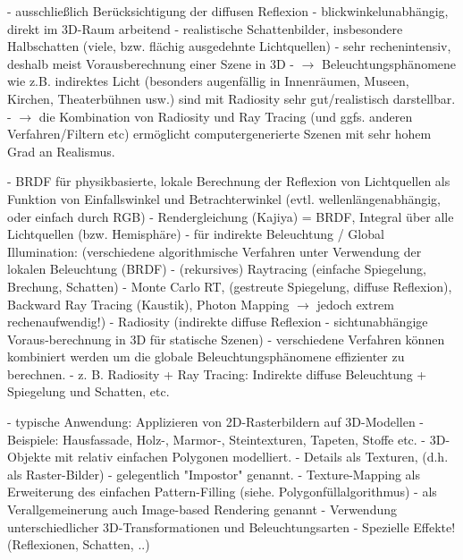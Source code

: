 \documentclass[10pt,landscape]{article}
\makeatletter
\renewcommand{\section}{\@startsection{section}{1}{0mm}%
                                {-1ex plus -.5ex minus -.2ex}%
                                {0.5ex plus .2ex}%
                                {\normalfont\large\bfseries}}
\renewcommand{\subsection}{\@startsection{subsection}{2}{0mm}%
                                {-1explus -.5ex minus -.2ex}%
                                {0.5ex plus .2ex}%
                                {\normalfont\normalsize\bfseries}}
\makeatother
\begin{document}
\begin{multicols}{3}
  
  - ausschließlich Berücksichtigung der diffusen Reflexion
  - blickwinkelunabhängig, direkt im 3D-Raum arbeitend
  - realistische Schattenbilder, insbesondere Halbschatten (viele, bzw. flächig ausgedehnte Lichtquellen)
  - sehr rechenintensiv, deshalb meist Vorausberechnung einer Szene in 3D
  - $\rightarrow$ Beleuchtungsphänomene wie z.B. indirektes Licht (besonders augenfällig in Innenräumen, Museen, Kirchen, Theaterbühnen usw.) sind mit Radiosity sehr gut/realistisch darstellbar.
  - $\rightarrow$ die Kombination von Radiosity und Ray Tracing (und ggfs. anderen Verfahren/Filtern etc) ermöglicht computergenerierte Szenen mit sehr hohem Grad an Realismus.
  
  - BRDF für physikbasierte, lokale Berechnung der Reflexion von Lichtquellen als Funktion von Einfallswinkel und Betrachterwinkel (evtl. wellenlängenabhängig, oder einfach durch RGB) 
  - Rendergleichung (Kajiya) = BRDF, Integral über alle Lichtquellen (bzw. Hemisphäre)
  - für indirekte Beleuchtung / Global Illumination: (verschiedene algorithmische Verfahren unter Verwendung der lokalen Beleuchtung (BRDF)
  - (rekursives) Raytracing (einfache Spiegelung, Brechung, Schatten)
  - Monte Carlo RT, (gestreute Spiegelung, diffuse Reflexion), Backward Ray Tracing (Kaustik), Photon Mapping $\rightarrow$ jedoch extrem rechenaufwendig!)
  - Radiosity (indirekte diffuse Reflexion - sichtunabhängige Voraus-berechnung in 3D für statische Szenen)
  - verschiedene Verfahren können kombiniert werden um die globale Beleuchtungsphänomene effizienter zu berechnen. - z. B. Radiosity + Ray Tracing: Indirekte diffuse Beleuchtung + Spiegelung und Schatten, etc.
  
  - typische Anwendung: Applizieren von 2D-Rasterbildern auf 3D-Modellen
  - Beispiele: Hausfassade, Holz-, Marmor-, Steintexturen, Tapeten, Stoffe etc.
  - 3D-Objekte mit relativ einfachen Polygonen modelliert. - Details als Texturen, (d.h. als Raster-Bilder) - gelegentlich "Impostor" genannt.
  - Texture-Mapping als Erweiterung des einfachen Pattern-Filling (siehe. Polygonfüllalgorithmus)
  - als Verallgemeinerung auch Image-based Rendering genannt
  - Verwendung unterschiedlicher 3D-Transformationen und Beleuchtungsarten
  - Spezielle Effekte! (Reflexionen, Schatten, ..)
  

\end{multicols}
\end{document}
